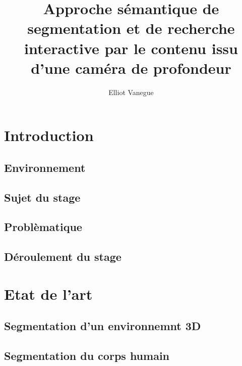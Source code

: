 \documentclass[a4paper,11pt]{article}
\title{Approche sémantique de segmentation et de recherche interactive par le contenu issu d’une caméra de profondeur}
\author{Elliot Vanegue}
\begin{document}
\maketitle
\newpage
\tableofcontents
\newpage

\begin{abstract}
\end{abstract}

\section{Introduction}
\subsection{Environnement}
\subsection{Sujet du stage}
\subsection{Problèmatique}
\subsection{Déroulement du stage}

\section{Etat de l'art}

\subsection{Segmentation d'un environnemnt 3D}

\subsection{Segmentation du corps humain}
\end{document}
